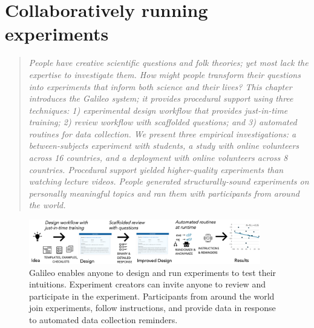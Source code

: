 \chapter{Collaboratively running experiments}
\begin{quote}
\emph{People have creative scientific questions and folk theories;
yet most lack the expertise to investigate them. How might
people transform their questions into experiments that
inform both science and their lives? This chapter introduces
the Galileo system; it provides procedural support using
three techniques: 1) experimental design workflow that
provides just-in-time training; 2) review workflow with
scaffolded questions; and 3) automated routines for data
collection. We present three empirical investigations: a
between-subjects experiment with students, a study with
online volunteers across 16 countries, and a deployment
with online volunteers across 8 countries. Procedural
support yielded higher-quality experiments than watching
lecture videos. People generated structurally-sound experiments
on personally meaningful topics and ran them with
participants from around the world.}
\end{quote}

\begin{figure}[h] 
  \centering
  \includegraphics[width=0.9\textwidth]{figures/galileo/galileo-1}
  \caption[Galileo enables anyone to design and run experiments to test their intuitions]
{Galileo enables anyone to design and run experiments to test their intuitions. Experiment creators can invite anyone to review and participate in the experiment. Participants from around the world join experiments, follow instructions, and provide data in response to automated data collection reminders.}
  \label{fig:galileo-1}
\end{figure}

\vspace{0.25in}

